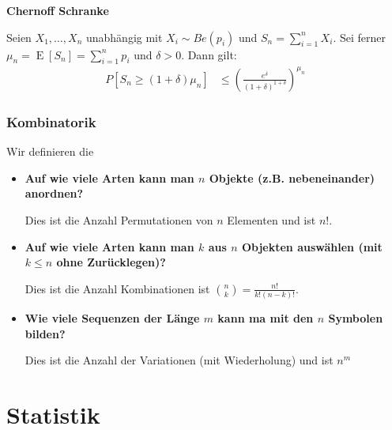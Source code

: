 \documentclass[25pt]{sciposter}
\newcommand{\E}{\operatorname{E}}
\newenvironment{method}[1]{\begin{mdframed}[backgroundcolor=blue!10,innertopmargin=15pt, innerbottommargin=15pt,nobreak=true]
		\textbf{#1 }
	}
	{ 
	\end{mdframed}
}
\begin{document}
\begin{multicols}{3}
\begin{method}{Chernoff Schranke}
	Seien $X_1,\ldots,X_n$ unabhängig mit $X_i \sim Be(p_i)$ und $S_n = \sum_{i=1}^{n}X_i$. Sei ferner $\mu_n = \E[S_n] = \sum_{i=1}^{n} p_i$ und $\delta > 0$. Dann gilt:
	\begin{align*}
		P[S_n \geq (1+\delta)\mu_n] &\leq \left(\frac{e^\delta}{(1+\delta)^{1+\delta}}\right)^{\mu_n}
	\end{align*}
\end{method}

\section {Kombinatorik}

Wir definieren die 

\begin{itemize}
	\item \textbf{Auf wie viele Arten kann man $n$ Objekte (z.B. nebeneinander) anordnen?}
	
	Dies ist die Anzahl Permutationen von $n$ Elementen und ist $n!$.
	
	
	\item 	\textbf{Auf wie viele Arten kann man $k$ aus $n$ Objekten auswählen (mit $k\leq n$ ohne Zurücklegen)?}
	
	Dies ist die Anzahl Kombinationen ist $\binom{n}{k} = \frac{n!}{k!(n-k)!}$.
	
	
	\item \textbf{Wie viele Sequenzen der Länge $m$ kann ma mit den $n$ Symbolen bilden?}
	
	Dies ist die Anzahl der Variationen (mit Wiederholung) und ist $n^m$
\end{itemize}


\part{Statistik}

\vfill


\newpage












\end{multicols}
\end{document}

